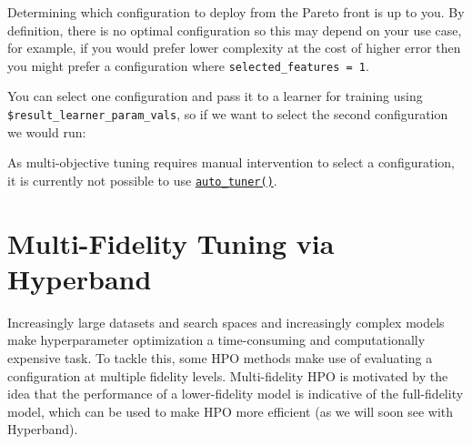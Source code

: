 Determining which configuration to deploy from the Pareto front is up to
you. By definition, there is no optimal configuration so this may depend
on your use case, for example, if you would prefer lower complexity at
the cost of higher error then you might prefer a configuration where
\texttt{selected\_features\ =\ 1}.

You can select one configuration and pass it to a learner for training
using \texttt{\$result\_learner\_param\_vals}, so if we want to select
the second configuration we would run:

\begin{Shaded}
\begin{Highlighting}[]
\OtherTok{=} \NormalTok{(}\NormalTok{)}
\SpecialCharTok{$}\SpecialCharTok{$}\OtherTok{=}\SpecialCharTok{$}\NormalTok{result\_learner\_param\_vals[[}\NormalTok{]]}
\end{Highlighting}
\end{Shaded}

As multi-objective tuning requires manual intervention to select a
configuration, it is currently not possible to use
\href{https://mlr3tuning.mlr-org.com/reference/auto_tuner.html}{\texttt{auto\_tuner()}}.

\hypertarget{sec-hyperband}{%
\section{Multi-Fidelity Tuning via Hyperband}\label{sec-hyperband}}

Increasingly large datasets and search spaces and increasingly complex
models make hyperparameter optimization a time-consuming and
computationally expensive task. To tackle this, some HPO methods make
use of evaluating a configuration at multiple fidelity
levels. Multi-fidelity
HPO is motivated by the idea that the performance of
a lower-fidelity model is indicative of the full-fidelity model, which
can be used to make HPO more efficient (as we will soon see with
Hyperband).

